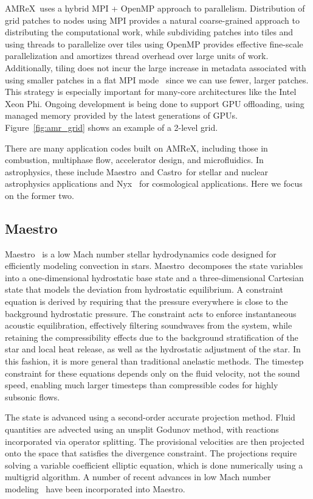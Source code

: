 \documentclass[a4paper]{jpconf}
\newcommand{\maestro}{{\sffamily Maestro}}
\newcommand{\castro}{{\sffamily Castro}}
\newcommand{\nyx}{{\sffamily Nyx}}
\newcommand{\amrex}{{\sffamily AMReX}}
\begin{document}
\amrex\ uses a hybrid MPI + OpenMP approach to parallelism.
Distribution of grid patches to nodes using MPI provides a natural
coarse-grained approach to distributing the computational work, while
subdividing patches into tiles and using threads to parallelize over
tiles using OpenMP provides effective fine-scale parallelization and
amortizes thread overhead over large units of work.  Additionally,
tiling does not incur the large increase in metadata
associated with using smaller patches in a flat MPI
mode~\cite{tiling} since we can use fewer, larger patches.
This strategy is especially important for
many-core architectures like the Intel Xeon Phi.  Ongoing development is being
done to support GPU offloading, using managed memory provided by the
latest generations of GPUs.  Figure~\ref{fig:amr_grid} shows an
example of a 2-level grid.

There are many application codes built on \amrex, including those in
combustion, multiphase flow, accelerator design, and microfluidics. In
astrophysics, these include \maestro\ and \castro\ for stellar and
nuclear astrophysics applications and \nyx~\cite{nyx} for cosmological
applications.  Here we focus on the former two.

\subsection{\maestro}

\maestro~\cite{MAESTRO:Multilevel} is a low Mach number stellar
hydrodynamics code designed for efficiently modeling convection in
stars.  \maestro\ decomposes the state variables into a one-dimensional
hydrostatic base state and a three-dimensional Cartesian state that
models the deviation from hydrostatic equilibrium.
A constraint equation is derived by
requiring that the pressure everywhere is close to the background
hydrostatic pressure.  The constraint acts to enforce instantaneous
acoustic equilibration, effectively filtering soundwaves from the
system, while retaining the compressibility effects due to the
background stratification of the star and local heat release, as well
as the hydrostatic adjustment of the star.  In this fashion, it is
more general than traditional anelastic methods.  The timestep
constraint for these equations depends only on the fluid velocity, not
the sound speed, enabling much larger timesteps than compressible
codes for highly subsonic flows.

The state is advanced using a second-order accurate projection method.
Fluid quantities are advected using an unsplit Godunov method, with
reactions incorporated via operator splitting.  The provisional
velocities are then projected onto the space that satisfies the
divergence constraint.  The projections require solving a variable
coefficient elliptic equation, which is done numerically using a
multigrid algorithm.  A number of recent advances in low Mach number
modeling~\cite{kleinpauluis,vasil:2013} have been incorporated into
\maestro.
\end{document}
